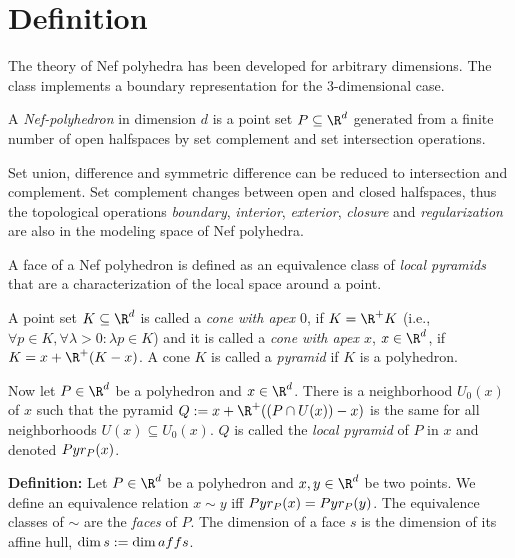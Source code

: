 \section{Definition}

The theory of Nef polyhedra has been developed for arbitrary
dimensions. The class  implements a
boundary representation for the 3-dimensional case.

\vspace{2ex}{\bf Definition:}\quad
    A \emph{Nef-poly\-he\-dron} in dimension $d$ is a point set $P \subseteq
    \R^d$ generated from a finite number of open halfspaces by set
    complement and set intersection operations.
\vspace{2ex}

Set union, difference and symmetric difference can be reduced to
intersection and complement. Set complement changes between open
and closed halfspaces, thus the topological operations \emph{boundary},
\emph{interior}, \emph{exterior}, \emph{closure} and {\em
regularization} are also in the modeling space of Nef polyhedra.

A face of a Nef polyhedron is defined as an equivalence class of
\emph{local pyramids} that are a characterization of the local space
around a point.

\vspace{2ex}{\bf Definition:}\quad
    A point set $K \subseteq \R^d$ is called a \emph{cone with apex $0$},
    if $K = \R^{+} K$ (i.e., $\forall p \in K, \forall \lambda > 0: \lambda p
    \in K$) and it is called a \emph{cone with apex $x$}, $x \in \R^d$,
    if $K = x + \R^{+} (K - x)$. A cone $K$ is called a \emph{pyramid}
    if $K$ is a polyhedron.

    Now let $P \in \R^d$ be a polyhedron and $x \in \R^d$. There is a 
    neighborhood $U_0(x)$ of $x$ such that the pyramid $Q := x + \R^{+} 
    ((P \cap U(x)) - x)$ is the same for all neighborhoods $U(x) \subseteq
    U_0(x)$. $Q$ is called the \emph{local pyramid} of $P$ in $x$ and
    denoted $Pyr_P(x)$. 
\vspace{2ex}

{\bf Definition:}\quad
    Let $P \in \R^d$ be a polyhedron and $x, y \in \R^d$ be two points.
    We define an equivalence relation $x \sim y$ iff
    $Pyr_P(x) = Pyr_P(y)$. The equivalence classes of $\sim$ 
    are the \emph{faces} of $P$. The dimension of a face $s$ is the  
    dimension of its affine hull, $\dim s := \dim aff s$.
\vspace{2ex}

